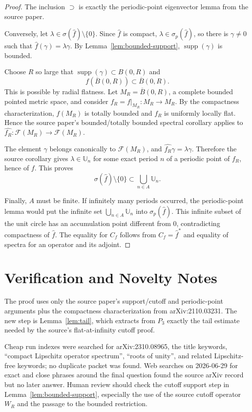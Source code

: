 \documentclass[11pt]{article}
\newcommand{\F}{\mathcal F}
\newcommand{\supp}{\operatorname{supp}}
\newcommand{\U}{\mathbb U}
\begin{document}
\begin{proof}
The inclusion \(\supset\) is exactly the periodic-point eigenvector lemma from
the source paper.

Conversely, let \(\lambda\in\sigma(\widehat f)\setminus\{0\}\).  Since
\(\widehat f\) is compact, \(\lambda\in\sigma_p(\widehat f)\), so there is
\(\gamma\ne0\) such that \(\widehat f(\gamma)=\lambda\gamma\).  By
Lemma~\ref{lem:bounded-support}, \(\supp(\gamma)\) is bounded.

Choose \(R\) so large that \(\supp(\gamma)\subset B(0,R)\) and
\[
f(\overline{B}(0,R))\subset \overline{B}(0,R).
\]
This is possible by radial flatness.  Let \(M_R=\overline{B}(0,R)\), a
complete bounded pointed metric space, and consider \(f_R=f|_{M_R}:M_R\to
M_R\).  By the compactness characterization, \(f(M_R)\) is totally bounded and
\(f_R\) is uniformly locally flat.  Hence the source paper's bounded/totally
bounded spectral corollary applies to \(\widehat{f_R}:\F(M_R)\to\F(M_R)\).

The element \(\gamma\) belongs canonically to \(\F(M_R)\), and
\(\widehat{f_R}\gamma=\lambda\gamma\).  Therefore the source corollary gives
\(\lambda\in\U_n\) for some exact period \(n\) of a periodic point of \(f_R\),
hence of \(f\).  This proves
\[
\sigma(\widehat f)\setminus\{0\}\subset \bigcup_{n\in A}\U_n.
\]

Finally, \(A\) must be finite.  If infinitely many periods occurred, the
periodic-point lemma would put the infinite set \(\bigcup_{n\in A}\U_n\) into
\(\sigma_p(\widehat f)\).  This infinite subset of the unit circle has an
accumulation point different from \(0\), contradicting compactness of
\(\widehat f\).  The equality for \(C_f\) follows from
\(C_f=\widehat f^*\) and equality of spectra for an operator and its adjoint.
\end{proof}

\section*{Verification and Novelty Notes}

The proof uses only the source paper's support/cutoff and periodic-point
arguments plus the compactness characterization from arXiv:2110.03231.  The
new step is Lemma~\ref{lem:tail}, which extracts from \(P_3\) exactly the
tail estimate needed by the source's flat-at-infinity cutoff proof.

Cheap run indexes were searched for arXiv:2310.08965, the title keywords,
``compact Lipschitz operator spectrum'', ``roots of unity'', and related
Lipschitz-free keywords; no duplicate packet was found.  Web searches on
2026-06-29 for exact and close phrases around the final question found the
source arXiv record but no later answer.  Human review should check the
cutoff support step in Lemma~\ref{lem:bounded-support}, especially the use of
the source cutoff operator \(W_R\) and the passage to the bounded restriction.
\end{document}
